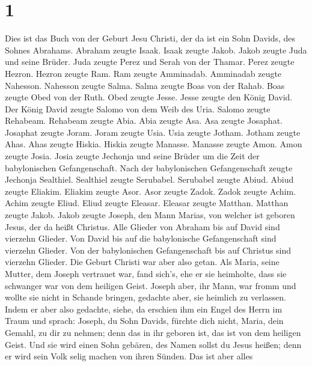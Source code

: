\hypertarget{section}{%
\section{1}\label{section}}

 Dies ist das Buch von der Geburt Jesu Christi, der da ist
ein Sohn Davids, des Sohnes Abrahams.  Abraham zeugte Isaak.
Isaak zeugte Jakob. Jakob zeugte Juda und seine Brüder. 
Juda zeugte Perez und Serah von der Thamar. Perez zeugte Hezron. Hezron
zeugte Ram.  Ram zeugte Amminadab. Amminadab zeugte
Nahesson. Nahesson zeugte Salma.  Salma zeugte Boas von der
Rahab. Boas zeugte Obed von der Ruth. Obed zeugte Jesse. 
Jesse zeugte den König David. Der König David zeugte Salomo von dem Weib
des Uria.  Salomo zeugte Rehabeam. Rehabeam zeugte Abia.
Abia zeugte Asa.  Asa zeugte Josaphat. Josaphat zeugte
Joram. Joram zeugte Usia.  Usia zeugte Jotham. Jotham zeugte
Ahas. Ahas zeugte Hiskia.  Hiskia zeugte Manasse. Manasse
zeugte Amon. Amon zeugte Josia.  Josia zeugte Jechonja und
seine Brüder um die Zeit der babylonischen Gefangenschaft. 
Nach der babylonischen Gefangenschaft zeugte Jechonja Sealthiel.
Sealthiel zeugte Serubabel.  Serubabel zeugte Abiud. Abiud
zeugte Eliakim. Eliakim zeugte Asor.  Asor zeugte Zadok.
Zadok zeugte Achim. Achim zeugte Eliud.  Eliud zeugte
Eleasar. Eleasar zeugte Matthan. Matthan zeugte Jakob. 
Jakob zeugte Joseph, den Mann Marias, von welcher ist geboren Jesus, der
da heißt Christus.  Alle Glieder von Abraham bis auf David
sind vierzehn Glieder. Von David bis auf die babylonische Gefangenschaft
sind vierzehn Glieder. Von der babylonischen Gefangenschaft bis auf
Christus sind vierzehn Glieder.  Die Geburt Christi war
aber also getan. Als Maria, seine Mutter, dem Joseph vertrauet war, fand
sich's, ehe er sie heimholte, dass sie schwanger war von dem heiligen
Geist.  Joseph aber, ihr Mann, war fromm und wollte sie
nicht in Schande bringen, gedachte aber, sie heimlich zu verlassen.
 Indem er aber also gedachte, siehe, da erschien ihm ein
Engel des Herrn im Traum und sprach: Joseph, du Sohn Davids, fürchte
dich nicht, Maria, dein Gemahl, zu dir zu nehmen; denn das in ihr
geboren ist, das ist von dem heiligen Geist.  Und sie wird
einen Sohn gebären, des Namen sollst du Jesus heißen; denn er wird sein
Volk selig machen von ihren Sünden.  Das ist aber alles
